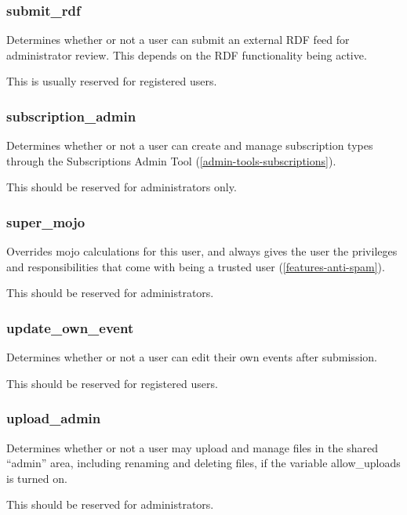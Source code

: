 \subsubsection{submit\_rdf}
\label{perm-submit-rdf}

Determines whether or not a user can submit an external RDF feed for administrator review.  This depends on the RDF functionality being active.

This is usually reserved for registered users.

\subsubsection{subscription\_admin}
\label{perm-subscription-admin}

Determines whether or not a user can create and manage subscription types through the Subscriptions Admin Tool (\ref{admin-tools-subscriptions}).

This should be reserved for administrators only.

\subsubsection{super\_mojo}
\label{perm-super-mojo}

Overrides mojo calculations for this user, and always gives the user the privileges and responsibilities that come with being a trusted user (\ref{features-anti-spam}).

This should be reserved for administrators.

\subsubsection{update\_own\_event}
\label{perm-update-own-event}

Determines whether or not a user can edit their own events after submission.

This should be reserved for registered users.

\subsubsection{upload\_admin}
\label{perm-upload-admin}

Determines whether or not a user may upload and manage files in the shared ``admin'' area, including renaming and deleting files, if the variable allow\_uploads is turned on.

This should be reserved for administrators.

